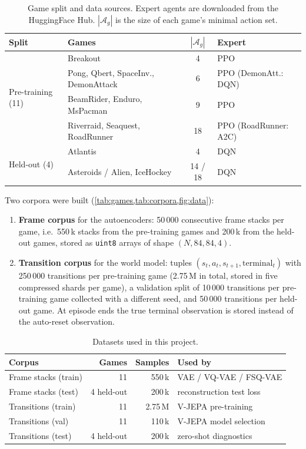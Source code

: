 \documentclass[runningheads]{llncs}
\begin{document}
\begin{table}[t]
\centering
\caption{Game split and data sources. Expert agents are downloaded from the
HuggingFace Hub. $|\mathcal{A}_g|$ is the size of each game's minimal action set.}
\label{tab:games}
\footnotesize\setlength{\tabcolsep}{4pt}
\begin{tabular}{@{}llcl@{}}
\toprule
Split & Games & $|\mathcal{A}_g|$ & Expert \\
\midrule
\multirow{4}{*}{Pre-training (11)}
 & Breakout & 4 & PPO \\
 & Pong, Qbert, SpaceInv., DemonAttack & 6 & PPO (DemonAtt.: DQN) \\
 & BeamRider, Enduro, MsPacman & 9 & PPO \\
 & Riverraid, Seaquest, RoadRunner & 18 & PPO (RoadRunner: A2C) \\
\midrule
\multirow{2}{*}{Held-out (4)}
 & Atlantis & 4 & DQN \\
 & Asteroids / Alien, IceHockey & 14 / 18 & DQN \\
\bottomrule
\end{tabular}
\end{table}

Two corpora were built (\cref{tab:games,tab:corpora,fig:data}):
\begin{enumerate}
  \item \textbf{Frame corpus} for the autoencoders: 50\,000 consecutive frame stacks per
  game, i.e.\ 550\,k stacks from the pre-training games and 200\,k from the held-out
  games, stored as \texttt{uint8} arrays of shape $(N,84,84,4)$.
  \item \textbf{Transition corpus} for the world model: tuples
  $(s_t,a_t,s_{t+1},\text{terminal}_t)$ with 250\,000 transitions per pre-training game
  (2.75\,M in total, stored in five compressed shards per game), a validation split of
  10\,000 transitions per pre-training game collected with a different seed, and
  50\,000 transitions per held-out game. At episode ends the true terminal observation is
  stored instead of the auto-reset observation.
\end{enumerate}

\begin{table}[t]
\centering
\caption{Datasets used in this project.}
\label{tab:corpora}
\setlength{\tabcolsep}{5pt}
\begin{tabular}{@{}lrrl@{}}
\toprule
Corpus & Games & Samples & Used by \\
\midrule
Frame stacks (train) & 11 & 550\,k & VAE / VQ-VAE / FSQ-VAE \\
Frame stacks (test) & 4 held-out & 200\,k & reconstruction test loss \\
Transitions (train) & 11 & 2.75\,M & V-JEPA pre-training \\
Transitions (val) & 11 & 110\,k & V-JEPA model selection \\
Transitions (test) & 4 held-out & 200\,k & zero-shot diagnostics \\
\bottomrule
\end{tabular}
\end{table}
\end{document}
